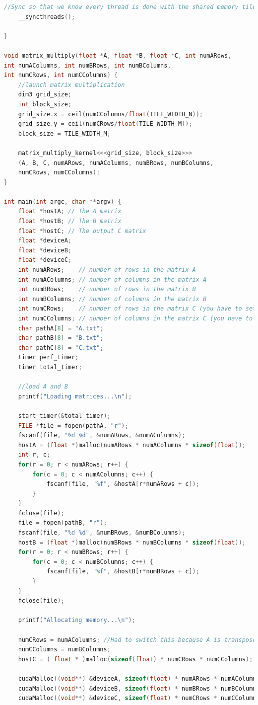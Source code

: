 \documentclass[11pt,a4paper]{article}
\begin{document}
\begin{lstlisting}[language=c]
	//Sync so that we know every thread is done with the shared memory tile
	__syncthreads();
	
}

void matrix_multiply(float *A, float *B, float *C, int numARows,
int numAColumns, int numBRows, int numBColumns,
int numCRows, int numCColumns) {
	//launch matrix multiplication
	dim3 grid_size;
	int block_size;
	grid_size.x = ceil(numCColumns/float(TILE_WIDTH_N));
	grid_size.y = ceil(numCRows/float(TILE_WIDTH_M));
	block_size = TILE_WIDTH_M;
	
	matrix_multiply_kernel<<<grid_size, block_size>>>
	(A, B, C, numARows, numAColumns, numBRows, numBColumns,
	numCRows, numCColumns);
}

int main(int argc, char **argv) {
	float *hostA; // The A matrix
	float *hostB; // The B matrix
	float *hostC; // The output C matrix
	float *deviceA;
	float *deviceB;
	float *deviceC;
	int numARows;    // number of rows in the matrix A
	int numAColumns; // number of columns in the matrix A
	int numBRows;    // number of rows in the matrix B
	int numBColumns; // number of columns in the matrix B
	int numCRows;    // number of rows in the matrix C (you have to set this)
	int numCColumns; // number of columns in the matrix C (you have to set this)
	char pathA[8] = "A.txt";
	char pathB[8] = "B.txt";
	char pathC[8] = "C.txt";
	timer perf_timer;
	timer total_timer;
	
	//load A and B
	printf("Loading matrices...\n");
	
	start_timer(&total_timer);
	FILE *file = fopen(pathA, "r");
	fscanf(file, "%d %d", &numARows, &numAColumns);
	hostA = (float *)malloc(numARows * numAColumns * sizeof(float));
	int r, c;
	for(r = 0; r < numARows; r++) {
		for(c = 0; c < numAColumns; c++) {
			fscanf(file, "%f", &hostA[r*numARows + c]);
		}
	}
	fclose(file);
	file = fopen(pathB, "r");
	fscanf(file, "%d %d", &numBRows, &numBColumns);
	hostB = (float *)malloc(numBRows * numBColumns * sizeof(float));
	for(r = 0; r < numBRows; r++) {
		for(c = 0; c < numBColumns; c++) {
			fscanf(file, "%f", &hostB[r*numBRows + c]);
		}
	}
	fclose(file);
	
	printf("Allocating memory...\n");
	
	numCRows = numAColumns; //Had to switch this because A is transposed
	numCColumns = numBColumns;
	hostC = ( float * )malloc(sizeof(float) * numCRows * numCColumns);
	
	cudaMalloc((void**) &deviceA, sizeof(float) * numARows * numAColumns);
	cudaMalloc((void**) &deviceB, sizeof(float) * numBRows * numBColumns);
	cudaMalloc((void**) &deviceC, sizeof(float) * numCRows * numCColumns);
	

\end{lstlisting}
\end{document}
